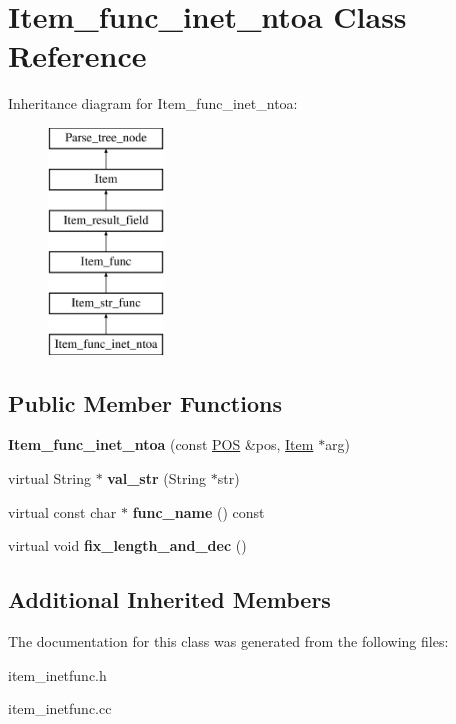 \hypertarget{classItem__func__inet__ntoa}{}\section{Item\+\_\+func\+\_\+inet\+\_\+ntoa Class Reference}
\label{classItem__func__inet__ntoa}
Inheritance diagram for Item\+\_\+func\+\_\+inet\+\_\+ntoa\+:\begin{figure}[H]
\begin{center}
\leavevmode
\includegraphics[height=6.000000cm]{classItem__func__inet__ntoa}
\end{center}
\end{figure}
\subsection*{Public Member Functions}
\begin{DoxyCompactItemize}
\item 
\mbox{\label{classItem__func__inet__ntoa_a2b9f1d49f5e5af3cf331195bdda55908}} 
{\bfseries Item\+\_\+func\+\_\+inet\+\_\+ntoa} (const \mbox{\hyperlink{structYYLTYPE}{P\+OS}} \&pos, \mbox{\hyperlink{classItem}{Item}} $\ast$arg)
\item 
\mbox{\label{classItem__func__inet__ntoa_aeb2507adaec5129f8f9169a337dff77a}} 
virtual String $\ast$ {\bfseries val\+\_\+str} (String $\ast$str)
\item 
\mbox{\label{classItem__func__inet__ntoa_a573f05e272eedd03f837e85059b29acc}} 
virtual const char $\ast$ {\bfseries func\+\_\+name} () const
\item 
\mbox{\label{classItem__func__inet__ntoa_ac654e57699db6624eeaf33f938463d2a}} 
virtual void {\bfseries fix\+\_\+length\+\_\+and\+\_\+dec} ()
\end{DoxyCompactItemize}
\subsection*{Additional Inherited Members}


The documentation for this class was generated from the following files\+:\begin{DoxyCompactItemize}
\item 
item\+\_\+inetfunc.\+h\item 
item\+\_\+inetfunc.\+cc\end{DoxyCompactItemize}
